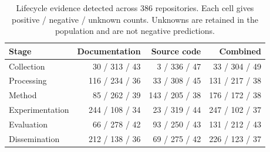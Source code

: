 \begin{table}[t]
\centering
\caption{Lifecycle evidence detected across 386 repositories. Each cell gives positive / negative / unknown counts. Unknowns are retained in the population and are not negative predictions.}
\label{tab:corpus-386}
\begin{tabular}{lrrr}
\toprule
Stage & Documentation & Source code & Combined \\
\midrule
Collection & 30 / 313 / 43 & 3 / 336 / 47 & 33 / 304 / 49 \\
Processing & 116 / 234 / 36 & 33 / 308 / 45 & 131 / 217 / 38 \\
Method & 85 / 262 / 39 & 143 / 205 / 38 & 176 / 172 / 38 \\
Experimentation & 244 / 108 / 34 & 23 / 319 / 44 & 247 / 102 / 37 \\
Evaluation & 66 / 278 / 42 & 93 / 250 / 43 & 131 / 212 / 43 \\
Dissemination & 212 / 138 / 36 & 69 / 275 / 42 & 226 / 123 / 37 \\
\bottomrule
\end{tabular}
\end{table}
